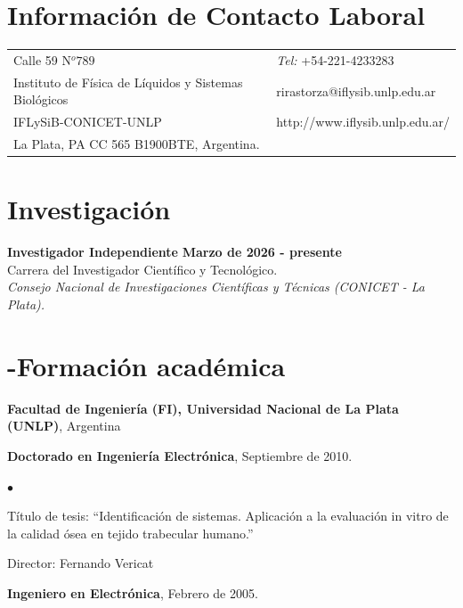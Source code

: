 \documentclass[margin,line]{res}
\newenvironment{list1}{
  \begin{list}{\ding{113}}{%
      \setlength{\itemsep}{0in}
      \setlength{\parsep}{0in} \setlength{\parskip}{0in}
      \setlength{\topsep}{0in} \setlength{\partopsep}{0in} 
      \setlength{\leftmargin}{0.17in}}}{\end{list}}
\newenvironment{list2}{
  \begin{list}{$\bullet$}{%
      \setlength{\itemsep}{0in}
      \setlength{\parsep}{0in} \setlength{\parskip}{0in}
      \setlength{\topsep}{0in} \setlength{\partopsep}{0in} 
      \setlength{\leftmargin}{0.2in}}}{\end{list}}
\begin{document}

\begin{resume}
\section{\sc Información de Contacto Laboral}
\vspace{.05in}
\begin{tabular}{@{}p{3.5in}p{3in}}
Calle 59 N$^o789$             & {\it Tel:} +54-221-4233283 \\            
Instituto de Física de Líquidos y Sistemas Biológicos & rirastorza@iflysib.unlp.edu.ar\\         
IFLySiB-CONICET-UNLP & http://www.iflysib.unlp.edu.ar/ \\       
La Plata, PA CC 565 B1900BTE, Argentina. & \\     
\end{tabular}

% 


\section{\sc Investigación}

{\bf Investigador Independiente } \hfill {\bf Marzo de 2026  - presente}\\
 Carrera del Investigador Científico y Tecnológico.\\
{\em Consejo Nacional de Investigaciones Científicas y Técnicas (CONICET - La Plata).}\\

\section{-Formación académica}
{\bf Facultad de Ingeniería (FI), Universidad Nacional de La Plata (UNLP)}, Argentina\\
\vspace*{.1in}
\begin{list1}
\item[] \textbf{Doctorado en Ingeniería Electrónica}, Septiembre de 2010.
\begin{list2}
\vspace*{.1in}
\item Título de tesis:  ``Identificación de sistemas. Aplicación a la evaluación in vitro de la calidad ósea en tejido trabecular humano.'' 
\item Director:  Fernando Vericat
\end{list2}
\vspace*{.3in}
\item[] \textbf{Ingeniero en Electrónica}, Febrero de 2005.
\end{list1}


\end{resume}
\end{document}
